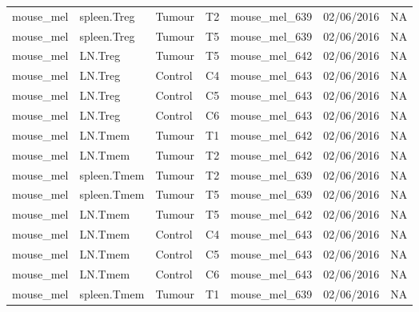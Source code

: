 \begin{table}[htp!]
\begin{tabular}{lllllll}
  mouse\_mel & spleen.Treg & Tumour & T2 & mouse\_mel\_639 & 02/06/2016 & NA \\ 
  mouse\_mel & spleen.Treg & Tumour & T5 & mouse\_mel\_639 & 02/06/2016 & NA \\ 
  mouse\_mel & LN.Treg & Tumour & T5 & mouse\_mel\_642 & 02/06/2016 & NA \\ 
  mouse\_mel & LN.Treg & Control & C4 & mouse\_mel\_643 & 02/06/2016 & NA \\ 
  mouse\_mel & LN.Treg & Control & C5 & mouse\_mel\_643 & 02/06/2016 & NA \\ 
  mouse\_mel & LN.Treg & Control & C6 & mouse\_mel\_643 & 02/06/2016 & NA \\ 
  mouse\_mel & LN.Tmem & Tumour & T1 & mouse\_mel\_642 & 02/06/2016 & NA \\ 
  mouse\_mel & LN.Tmem & Tumour & T2 & mouse\_mel\_642 & 02/06/2016 & NA \\ 
  mouse\_mel & spleen.Tmem & Tumour & T2 & mouse\_mel\_639 & 02/06/2016 & NA \\ 
  mouse\_mel & spleen.Tmem & Tumour & T5 & mouse\_mel\_639 & 02/06/2016 & NA \\ 
  mouse\_mel & LN.Tmem & Tumour & T5 & mouse\_mel\_642 & 02/06/2016 & NA \\ 
  mouse\_mel & LN.Tmem & Control & C4 & mouse\_mel\_643 & 02/06/2016 & NA \\ 
  mouse\_mel & LN.Tmem & Control & C5 & mouse\_mel\_643 & 02/06/2016 & NA \\ 
  mouse\_mel & LN.Tmem & Control & C6 & mouse\_mel\_643 & 02/06/2016 & NA \\ 
  mouse\_mel & spleen.Tmem & Tumour & T1 & mouse\_mel\_639 & 02/06/2016 & NA \\ 
   \bottomrule
\end{tabular}
\end{table}

